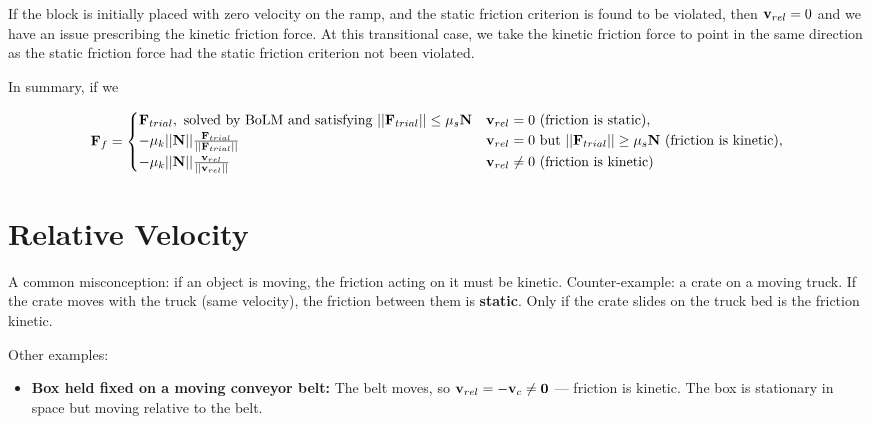 \documentclass[
  letterpaper,
  DIV=11,
  numbers=noendperiod]{scrreprt}
\providecommand{\tightlist}{%
  \setlength{\itemsep}{0pt}\setlength{\parskip}{0pt}}
\begin{document}
\begin{tcolorbox}[enhanced jigsaw, arc=.35mm, bottomrule=.15mm, bottomtitle=1mm, breakable, colback=white, colbacktitle=quarto-callout-tip-color!10!white, colframe=quarto-callout-tip-color-frame, coltitle=black, left=2mm, leftrule=.75mm, opacityback=0, opacitybacktitle=0.6, rightrule=.15mm, title=\textcolor{quarto-callout-tip-color}{\faLightbulb}\hspace{0.5em}{Think!}, titlerule=0mm, toprule=.15mm, toptitle=1mm]

If the block is initially placed with zero velocity on the ramp, and the
static friction criterion is found to be violated, then
\({\bf v}_{rel}=0\) and we have an issue prescribing the kinetic
friction force. At this transitional case, we take the kinetic friction
force to point in the same direction as the static friction force had
the static friction criterion not been violated.

In summary, if we

\begin{align}
    {\bf F}_f =
    \begin{cases}
        {\bf F}_{trial}, \text{ solved by BoLM and satisfying } ||{\bf F}_{trial}||\leq \mu_s{\bf N} & {\bf v}_{rel} = 0 \text{ (friction is static)},\\
        -\mu_k||{\bf N}||\frac{{\bf F}_{trial}}{||{\bf F}_{trial}||} & {\bf v}_{rel} = 0 \text{ but } ||{\bf F}_{trial}||\geq \mu_s{\bf N} \text{ (friction is kinetic)},\\
        -\mu_k||{\bf N}||\frac{{\bf v}_{rel}}{||{\bf v}_{rel}||} & {\bf v}_{rel} \neq 0 \text{ (friction is kinetic)}
    \end{cases}
\end{align}

\end{tcolorbox}

\section{Relative Velocity}\label{relative-velocity}

A common misconception: if an object is moving, the friction acting on
it must be kinetic. Counter-example: a crate on a moving truck. If the
crate moves with the truck (same velocity), the friction between them is
\textbf{static}. Only if the crate slides on the truck bed is the
friction kinetic.

Other examples:

\begin{itemize}
\tightlist
\item
  \textbf{Box held fixed on a moving conveyor belt:} The belt moves, so
  \({\bf v}_{rel} = -{\bf v}_c \neq {\bf 0}\) --- friction is kinetic.
  The box is stationary in space but moving relative to the belt.
\end{itemize}
\end{document}
